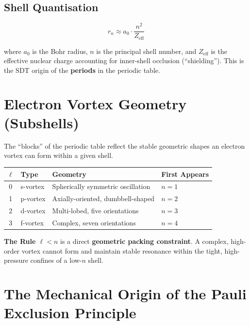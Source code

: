 \subsection{Shell Quantisation}

\begin{equation}\label{eq:shell-radii}
  r_n \approx a_0 \cdot \frac{n^2}{Z_{\text{eff}}}
\end{equation}

where $a_0$ is the Bohr radius, $n$ is the principal shell number, and $Z_{\text{eff}}$ is the effective nuclear charge accounting for inner-shell occlusion (``shielding'').  This is the SDT origin of the \textbf{periods} in the periodic table.


\section{Electron Vortex Geometry (Subshells)}

The ``blocks'' of the periodic table reflect the stable geometric shapes an electron vortex can form within a given shell.

\begin{center}
\begin{tabular}{clll}
\hline
$\ell$ & \textbf{Type} & \textbf{Geometry} & \textbf{First Appears} \\
\hline
0 & s-vortex & Spherically symmetric oscillation & $n = 1$ \\
1 & p-vortex & Axially-oriented, dumbbell-shaped & $n = 2$ \\
2 & d-vortex & Multi-lobed, five orientations & $n = 3$ \\
3 & f-vortex & Complex, seven orientations & $n = 4$ \\
\hline
\end{tabular}
\end{center}

\textbf{The Rule $\ell < n$} is a direct \textbf{geometric packing constraint}.  A complex, high-order vortex cannot form and maintain stable resonance within the tight, high-pressure confines of a low-$n$ shell.


\section{The Mechanical Origin of the Pauli Exclusion Principle}

